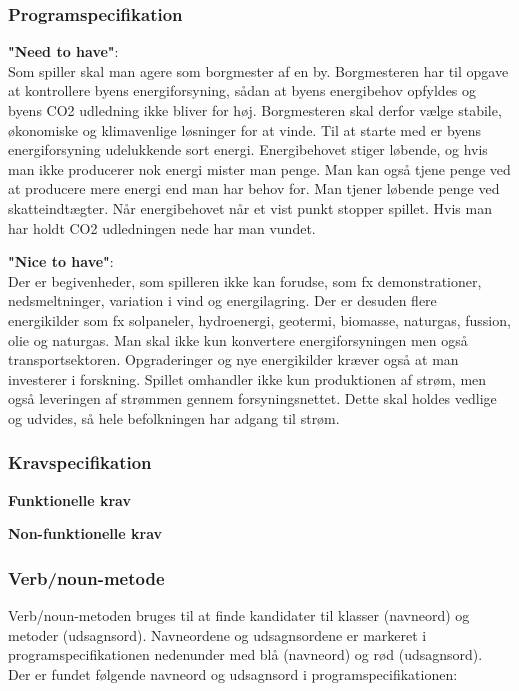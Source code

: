 \documentclass[a4paper,12pt]{report}
\begin{document}
\subsubsection{Programspecifikation}
\textbf{"Need to have"}:\\ Som spiller skal man agere som borgmester af en by. Borgmesteren har til opgave at kontrollere byens energiforsyning, sådan at byens energibehov opfyldes og byens CO2 udledning ikke bliver for høj. Borgmesteren skal derfor vælge stabile, økonomiske og klimavenlige løsninger for at vinde. Til at starte med er byens energiforsyning udelukkende sort energi. Energibehovet stiger løbende, og hvis man ikke producerer nok energi mister man penge. Man kan også tjene penge ved at producere mere energi end man har behov for. Man tjener løbende penge ved skatteindtægter. Når energibehovet når et vist punkt stopper spillet. Hvis man har holdt CO2 udledningen nede har man vundet.

\textbf{"Nice to have"}:\\ Der er begivenheder, som spilleren ikke kan forudse, som fx demonstrationer, nedsmeltninger, variation i vind og energilagring. Der er desuden flere energikilder som fx solpaneler, hydroenergi, geotermi, biomasse, naturgas, fussion, olie og naturgas. Man skal ikke kun konvertere energiforsyningen men også transportsektoren. Opgraderinger og nye energikilder kræver også at man investerer i forskning. Spillet omhandler ikke kun produktionen af strøm, men også leveringen af strømmen gennem forsyningsnettet. Dette skal holdes vedlige og udvides, så hele befolkningen har adgang til strøm.

\subsubsection{Kravspecifikation}
\textbf{Funktionelle krav}

\textbf{Non-funktionelle krav}

\subsubsection{Verb/noun-metode}
Verb/noun-metoden bruges til at finde kandidater til klasser (navneord) og metoder (udsagnsord). Navneordene og udsagnsordene er markeret i programspecifikationen nedenunder med blå (navneord) og rød (udsagnsord). \\

Der er fundet følgende navneord og udsagnsord i programspecifikationen:\\
\end{document}
